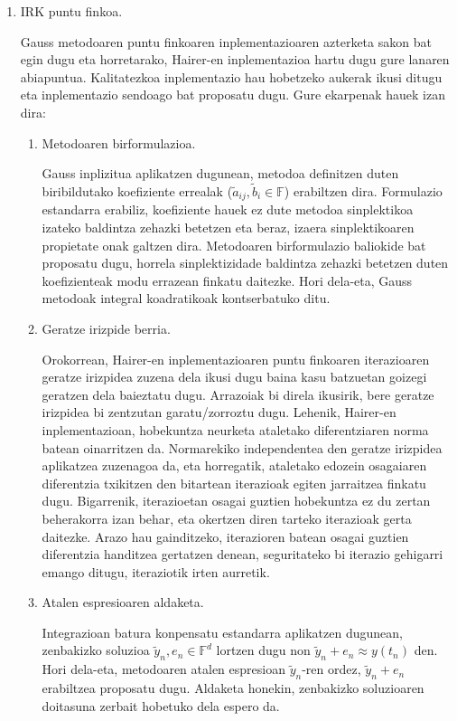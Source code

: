 \begin{enumerate}
\item IRK puntu finkoa.

Gauss metodoaren puntu finkoaren inplementazioaren azterketa sakon bat egin dugu eta horretarako, Hairer-en inplementazioa \cite{Hairer2008} hartu dugu gure lanaren abiapuntua. Kalitatezkoa inplementazio hau hobetzeko aukerak ikusi ditugu eta inplementazio sendoago bat proposatu dugu. Gure ekarpenak hauek izan dira:  

\begin{enumerate}
\item Metodoaren birformulazioa.

Gauss inplizitua aplikatzen dugunean, metodoa definitzen duten biribildutako koefiziente errealak ($\tilde{a}_{ij}, \tilde{b}_i \in \mathbb{F}$) erabiltzen dira. Formulazio estandarra erabiliz, koefiziente hauek ez dute metodoa sinplektikoa izateko baldintza zehazki betetzen eta beraz, izaera sinplektikoaren propietate onak galtzen dira. Metodoaren birformulazio baliokide bat proposatu dugu, horrela sinplektizidade baldintza zehazki betetzen duten koefizienteak modu errazean finkatu daitezke. Hori dela-eta, Gauss metodoak integral koadratikoak kontserbatuko ditu.

\item Geratze irizpide berria.

Orokorrean, Hairer-en inplementazioaren puntu finkoaren iterazioaren geratze irizpidea zuzena dela ikusi dugu baina kasu batzuetan goizegi geratzen dela baieztatu dugu. Arrazoiak bi direla ikusirik, bere geratze irizpidea bi zentzutan garatu/zorroztu dugu. Lehenik, Hairer-en inplementazioan, hobekuntza neurketa ataletako diferentziaren norma batean oinarritzen da. Normarekiko independentea den geratze irizpidea aplikatzea zuzenagoa da, eta horregatik, ataletako edozein osagaiaren diferentzia txikitzen den bitartean iterazioak egiten jarraitzea finkatu dugu. Bigarrenik, iterazioetan osagai guztien hobekuntza ez du zertan beherakorra izan behar, eta okertzen diren tarteko iterazioak gerta daitezke. Arazo hau gainditzeko, iterazioren batean osagai guztien diferentzia handitzea gertatzen denean, seguritateko bi iterazio gehigarri emango ditugu, iteraziotik irten aurretik.   

\item Atalen espresioaren aldaketa.

Integrazioan batura konpensatu estandarra aplikatzen dugunean, zenbakizko soluzioa $\tilde{y}_n, e_n \in \mathbb{F}^d$ lortzen dugu non $\tilde{y}_n+e_n \approx y(t_n)$ den. Hori dela-eta, metodoaren atalen espresioan $\tilde{y}_n$-ren ordez, $\tilde{y}_n+e_n$ erabiltzea proposatu dugu. Aldaketa honekin, zenbakizko soluzioaren doitasuna zerbait hobetuko dela espero da.


\end{enumerate}
\end{enumerate}
